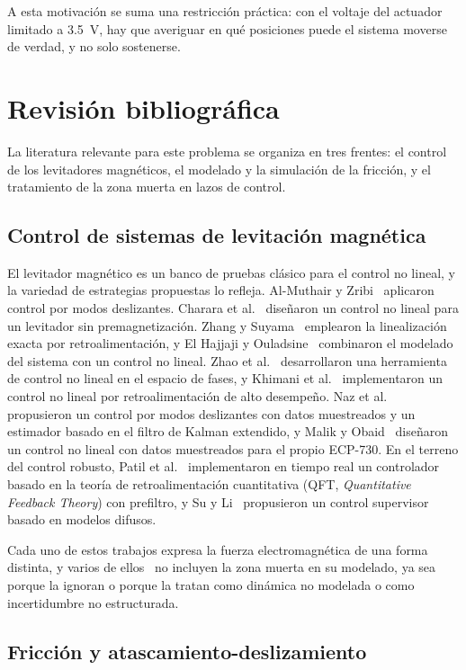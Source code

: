 A esta motivación se suma una restricción práctica: con el voltaje del actuador limitado a 3.5~V, hay que averiguar en qué posiciones puede el sistema moverse de verdad, y no solo sostenerse.

\section{Revisión bibliográfica}

La literatura relevante para este problema se organiza en tres frentes: el control de los levitadores magnéticos, el modelado y la simulación de la fricción, y el tratamiento de la zona muerta en lazos de control.

\subsection{Control de sistemas de levitación magnética}

El levitador magnético es un banco de pruebas clásico para el control no lineal, y la variedad de estrategias propuestas lo refleja. Al-Muthair y Zribi~\cite{al} aplicaron control por modos deslizantes. Charara et al.~\cite{charara} diseñaron un control no lineal para un levitador sin premagnetización. Zhang y Suyama~\cite{feifei} emplearon la linealización exacta por retroalimentación, y El Hajjaji y Ouladsine~\cite{el} combinaron el modelado del sistema con un control no lineal. Zhao et al.~\cite{zhao} desarrollaron una herramienta de control no lineal en el espacio de fases, y Khimani et al.~\cite{khimani} implementaron un control no lineal por retroalimentación de alto desempeño. Naz et al.~\cite{neelma} propusieron un control por modos deslizantes con datos muestreados y un estimador basado en el filtro de Kalman extendido, y Malik y Obaid~\cite{maaz} diseñaron un control no lineal con datos muestreados para el propio ECP-730. En el terreno del control robusto, Patil et al.~\cite{mukesh} implementaron en tiempo real un controlador basado en la teoría de retroalimentación cuantitativa (QFT, \emph{Quantitative Feedback Theory}) con prefiltro, y Su y Li~\cite{kuo1} propusieron un control supervisor basado en modelos difusos.

Cada uno de estos trabajos expresa la fuerza electromagnética de una forma distinta, y varios de ellos~\cite{khimani,mukesh,neelma} no incluyen la zona muerta en su modelado, ya sea porque la ignoran o porque la tratan como dinámica no modelada o como incertidumbre no estructurada.

\subsection{Fricción y atascamiento-deslizamiento}


